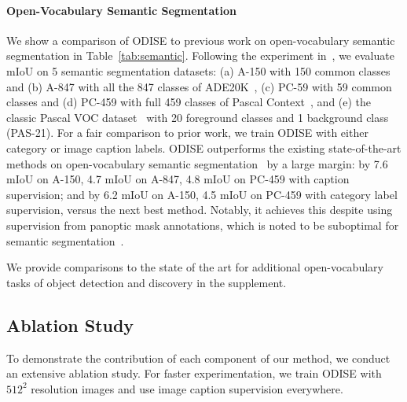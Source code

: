 \documentclass[10pt,twocolumn,letterpaper]{article}
\newcommand{\ourmethod}{ODISE}
\begin{document}
\paragraph{Open-Vocabulary Semantic Segmentation}
We show a comparison of \ourmethod{} to previous work on open-vocabulary semantic segmentation in Table~\ref{tab:semantic}. 
Following the experiment in~\cite{ghiasi2021open}, we evaluate mIoU on 5 semantic segmentation datasets: (a) A-150 with 150 common classes and (b) A-847 with all the 847 classes of ADE20K~\cite{zhou2019ade}, (c) PC-59 with 59 common classes and (d) PC-459 with full 459 classes of Pascal Context~\cite{mottaghi2014ctx}, and (e) the classic Pascal VOC dataset~\cite{everingham2010pascal} with 20 foreground classes and 1 background class (PAS-21).
For a fair comparison to prior work, we train \ourmethod{} with either category or image caption labels. 
\ourmethod{} outperforms the existing state-of-the-art methods on open-vocabulary semantic segmentation~\cite{ghiasi2021open, ding2022open} by a large margin: by 7.6 mIoU on A-150, 4.7 mIoU on A-847, 4.8 mIoU on PC-459 with caption supervision; and by 6.2 mIoU on A-150, 4.5 mIoU on PC-459 with category label supervision, versus the next best method.
Notably, it achieves this despite using supervision from panoptic mask annotations, which is noted to be suboptimal for semantic segmentation~\cite{cheng2022mask2former}. 

We provide comparisons to the state of the art for additional open-vocabulary tasks of object detection and discovery in the supplement.

\subsection{Ablation Study}

To demonstrate the contribution of each component of our method, we conduct an extensive ablation study. 
For faster experimentation, we train \ourmethod{} with $512^2$ resolution images and use image caption supervision everywhere. 
\end{document}
